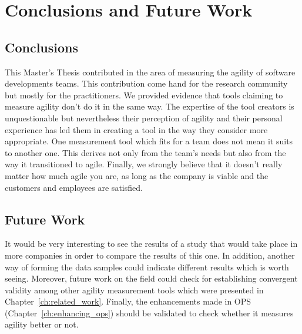 \chapter{Conclusions and Future Work}
\label{ch:conclusions_future_work}

\section{Conclusions}

This Master's Thesis contributed in the area of measuring the agility of software developments teams. This contribution come hand for the research community but mostly for the practitioners. We provided evidence that tools claiming to measure agility don't do it in the same way. The expertise of the tool creators is unquestionable but nevertheless their perception of agility and their personal experience has led them in creating a tool in the way they consider more appropriate. One measurement tool which fits for a team does not mean it suits to another one. This derives not only from the team's needs but also from the way it transitioned to agile. Finally, we strongly believe that it doesn't really matter how much agile you are, as long as the company is viable and the customers and employees are satisfied.

\section{Future Work}

It would be very interesting to see the results of a study that would take place in more companies in order to compare the results of this one. In addition, another way of forming the data samples could indicate different results which is worth seeing. Moreover, future work on the field could check for establishing convergent validity among other agility measurement tools which were presented in Chapter~\ref{ch:related_work}. Finally, the enhancements made in \ac{OPS} (Chapter~\ref{ch:enhancing_ops})  should be validated to check whether it measures agility better or not.